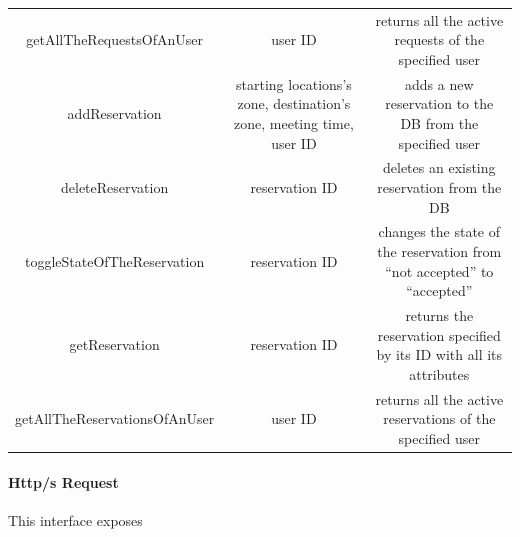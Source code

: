 \documentclass{article}
\begin{document}
\begin{itemize}
\begin{tabular}{*{3}{c}}
			getAllTheRequestsOfAnUser & user ID & returns all the active requests of the specified user \\
			addReservation & starting locations's zone, destination's zone, meeting time, user ID & adds a new reservation to the DB from the specified user\\
			deleteReservation & reservation ID & deletes an existing reservation from the DB\\
			toggleStateOfTheReservation & reservation ID & changes the state of the reservation from ``not accepted'' to ``accepted''\\
			getReservation & reservation ID & returns the reservation specified by its ID with all its attributes\\
			getAllTheReservationsOfAnUser & user ID & returns all the active reservations of the specified user \\ %
			\bottomrule
		\end{tabular}	
\end{itemize}
\paragraph{Http/s Request}
This interface exposes  %
\end{document}
